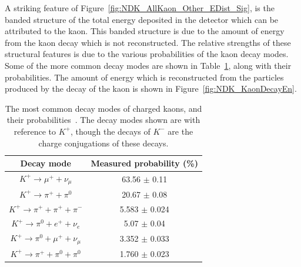 A striking feature of Figure~\ref{fig:NDK_AllKaon_Other_EDist_Sig}, is the banded structure of the total energy deposited in the detector which can be attributed to the kaon. This banded structure is due to the amount of energy from the kaon decay which is not reconstructed. The relative strengths of these structural features is due to the various probabilities of the kaon decay modes. Some of the more common decay modes are shown in Table~\ref{tab:NDK_KaonDecayRat}, along with their probabilities. The amount of energy which is reconstructed from the particles produced by the decay of the kaon is shown in Figure~\ref{fig:NDK_KaonDecayEn}. \\

\begin{table}
  \caption[The most common decay modes of charged kaons, and their probabilities]
          {The most common decay modes of charged kaons, and their probabilities~\citep{PDGReview}. The decay modes shown are with reference to $K^{+}$, though the decays of $K^{-}$ are the charge conjugations of these decays.}
  \centering
  \label{tab:NDK_KaonDecayRat}
  \begin{tabular}{c c}
    \toprule
        {Decay mode}                                      & {Measured probability (\%)} \\
        \midrule
        $K^{+} \rightarrow \mu^{+} + \nu_{\mu}$           & 63.56 $\pm$ 0.11 \\

        $K^{+} \rightarrow \pi^{+} + \pi^{0}$             & 20.67 $\pm$ 0.08 \\

        $K^{+} \rightarrow \pi^{+} + \pi^{+} + \pi^{-}$   & 5.583 $\pm$ 0.024 \\

        $K^{+} \rightarrow \pi^{0} + e^{+} + \nu_{e}$     & 5.07 $\pm$ 0.04 \\

        $K^{+} \rightarrow \pi^{0} + \mu^{+} + \nu_{\mu}$ & 3.352 $\pm$ 0.033 \\

        $K^{+} \rightarrow \pi^{+} + \pi^{0} + \pi^{0}$   & 1.760 $\pm$ 0.023 \\
        \bottomrule
  \end{tabular}
\end{table}

